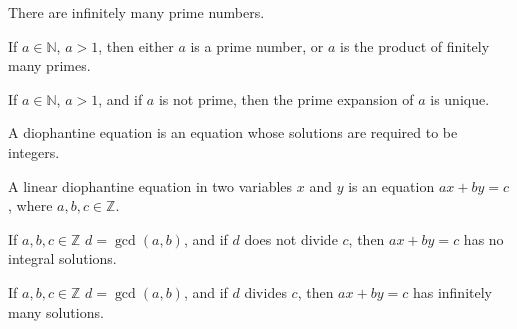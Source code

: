         \begin{theorem}
           There are infinitely many prime numbers.
        \end{theorem}
        \begin{theorem}
           If $a\in\mathbb{N}$, $a>1$, then either
           $a$ is a prime number, or $a$ is the product
           of finitely many primes.
        \end{theorem}
        \begin{theorem}
           If $a\in\mathbb{N}$, $a>1$, and if $a$ is not
           prime, then the prime expansion of $a$ is
           unique.
        \end{theorem}
        \begin{definition}
           A diophantine equation is an equation whose
           solutions are required to be integers.
        \end{definition}
        \begin{definition}
           A linear diophantine equation in two variables
           $x$ and $y$ is an equation
           $ax+by=c$, where $a,b,c\in\mathbb{Z}$.
        \end{definition}
        \begin{theorem}
           If $a,b,c\in\mathbb{Z}$ $d=\gcd(a,b)$, and if $d$ does not
           divide $c$, then $ax+by=c$ has no integral solutions.
        \end{theorem}
        \begin{theorem}
           If $a,b,c\in\mathbb{Z}$ $d=\gcd(a,b)$, and if $d$ divides $c$,
           then $ax+by=c$ has infinitely many solutions.
        \end{theorem}